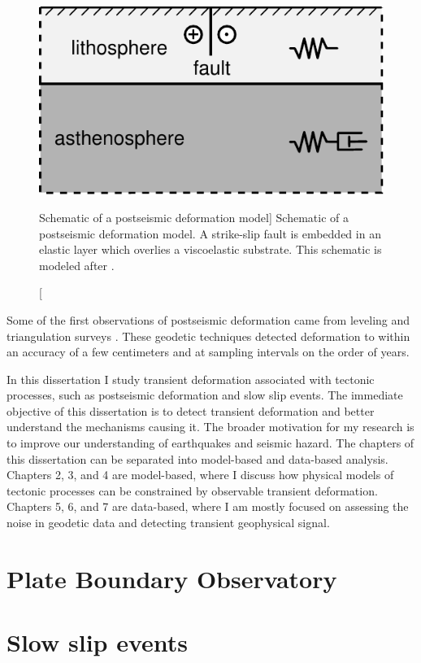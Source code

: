 \begin{figure}
\includegraphics{schematic}
\caption
[Schematic of a postseismic deformation model]
{Schematic of a postseismic deformation model. A strike-slip fault is
embedded in an elastic layer which overlies a viscoelastic substrate.
This schematic is modeled after \citep{Savage1978}.}
\label{intro:fig:1}
\end{figure}

Some of the first observations of postseismic deformation came from
leveling and triangulation surveys \citep[e.g,][]{Kanamori1973,
Thatcher1975}. These geodetic techniques detected deformation to
within an accuracy of a few centimeters and at sampling intervals on
the order of years. 



In this dissertation I study transient deformation associated with
tectonic processes, such as postseismic deformation and slow slip
events. The immediate objective of this dissertation is to detect
transient deformation and better understand the mechanisms causing it.
The broader motivation for my research is to improve our understanding
of earthquakes and seismic hazard. The chapters of this dissertation
can be separated into model-based and data-based analysis. Chapters 2,
3, and 4 are model-based, where I discuss how physical models of
tectonic processes can be constrained by observable transient
deformation. Chapters 5, 6, and 7 are data-based, where I am mostly
focused on assessing the noise in geodetic data and detecting
transient geophysical signal.

\section{Plate Boundary Observatory}


\section{Slow slip events}


